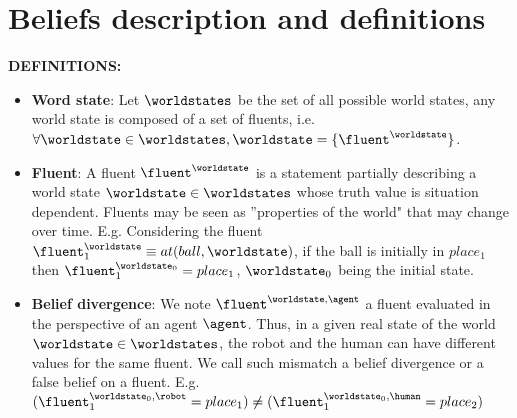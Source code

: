 \section{Beliefs description and definitions}
\textbf{DEFINITIONS:}
\begin{itemize}

    \item \textbf{Word state}: Let $\worldstates$ be the set of all possible world states, any world state is composed of a set of fluents, i.e. $\forall\worldstate\in\worldstates, \worldstate=\{ \fluent^\worldstate \}$.
    
    \item \textbf{Fluent}: A fluent $\fluent^\worldstate$ is a statement partially describing a world state $\worldstate\in\worldstates$ whose truth value is situation dependent. Fluents may be seen as ''properties of the world" that may change over time.
    \subitem E.g. Considering the fluent $\fluent_1^\worldstate \equiv at(ball, \worldstate)$, if the ball is initially in $place_1$ then $\fluent_1^{\worldstate_0}=place_1$, $\worldstate_0$ being the initial state.
    
    \item \textbf{Belief divergence}: We note $\fluent^{\worldstate,\agent}$ a fluent evaluated in the perspective of an agent $\agent$. Thus, in a given real state of the world $\worldstate\in\worldstates$, the robot and the human can have different values for the same fluent. We call such mismatch a belief divergence or a false belief on a fluent.
    \subitem E.g. $(\fluent_1^{\worldstate_0,\robot}=place_1) \neq (\fluent_1^{\worldstate_0,\human}=place_2)$
    
    

\end{itemize}
